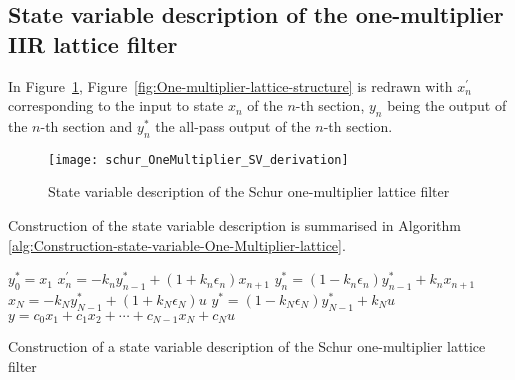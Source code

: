 \documentclass[a4paper,twoside,10pt,english]{report}
\begin{document}
\subsection{\label{State-Variable-Description-One-Multiplier-IIR-Lattice-Filter}State variable description of the one-multiplier IIR lattice filter}
In Figure~\ref{fig:State-variable-description-One-Multiplier-Lattice},
Figure~\ref{fig:One-multiplier-lattice-structure} is redrawn with
$x_{n}^{\prime}$ corresponding to the input to state $x_{n}$ of
the $n$-th section, $y_{n}$ being the output of the $n$-th section
and $y_{n}^{*}$ the all-pass output of the $n$-th section.
\begin{figure}[!htbp]
\begin{center}
\texttt{[image: schur\_OneMultiplier\_SV\_derivation]}
\caption{State variable description of the Schur one-multiplier lattice filter}
\label{fig:State-variable-description-One-Multiplier-Lattice}
\end{center}
\end{figure}
Construction of the state variable description is summarised in Algorithm
\ref{alg:Construction-state-variable-One-Multiplier-lattice}.
\begin{algorithm}[!htbp]
\begin{algorithmic}
\State $y_{0}^{*} = x_{1}$
  \State $x_{n}^{\prime} = -k_{n}y_{n-1}^{*}+\left(1+k_{n}\epsilon_{n}\right)x_{n+1}$
  \State $y_{n}^{*} = \left(1-k_{n}\epsilon_{n}\right)y_{n-1}^{*}+k_{n}x_{n+1}$
\EndFor
\State $x_{N} = -k_{N}y_{N-1}^{*}+\left(1+k_{N}\epsilon_{N}\right)u$
\State $y^{*} = \left(1-k_{N}\epsilon_{N}\right)y_{N-1}^{*}+k_{N}u$
\State $y  = c_{0}x_{1}+c_{1}x_{2}+\cdots+c_{N-1}x_{N}+c_{N}u$
\end{algorithmic}
\caption{Construction of a state variable description of the Schur one-multiplier lattice filter}
\label{alg:Construction-state-variable-One-Multiplier-lattice}
\end{algorithm}
\end{document}
